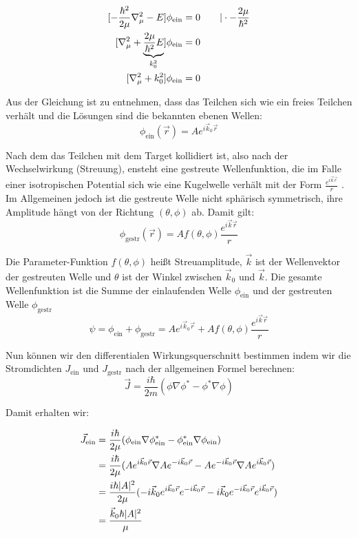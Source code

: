 \begin{align}
  \label{eq:7}
  [ -\frac{\hbar^2}{2\mu}\nabla_\mu^2 - E] \phi_{\text{ein}} &= 0 \qquad |\cdot -\frac{2\mu}{\hbar^2} \notag \\
  [ \nabla_\mu^2 +\underbrace{\frac{2\mu}{\hbar^2}  E}_{k_0^2} ] \phi_{\text{ein}} &= 0 \notag\\
  [ \nabla_\mu^2 +k_0^2 ] \phi_{\text{ein}} &= 0
\end{align}

Aus der Gleichung ist zu entnehmen, dass das Teilchen sich wie ein freies Teilchen verhält und die Lösungen sind die bekannten ebenen Wellen:
\begin{equation}
  \label{eq:8}
  \phi_{\text{ein}}(\vec r) = A e^{i\vec k_{0}\vec r}
\end{equation}

Nach dem das Teilchen mit dem Target kollidiert ist, also nach der Wechselwirkung (Streuung), ensteht eine gestreute Wellenfunktion, die im Falle einer isotropischen Potential sich wie eine Kugelwelle verhält mit der Form \(\frac{e^{i\vec k\vec r}}{r}\) . Im Allgemeinen jedoch ist die gestreute Welle nicht sphärisch symmetrisch, ihre Amplitude hängt von der Richtung \((\theta,\phi)\) ab. Damit gilt:
\begin{equation}
  \label{eq:9}
  \phi_{\text{gestr}}(\vec r) = A f(\theta,\phi)\frac{e^{i\vec k\vec r}}{r} 
\end{equation}

Die Parameter-Funktion \(f(\theta,\phi)\) heißt Streuamplitude, \(\vec k\) ist der Wellenvektor der gestreuten Welle und \(\theta\) ist der Winkel zwischen \(\vec k_0\) und \(\vec k\). Die gesamte Wellenfunktion ist die Summe der einlaufenden Welle \(\phi_{\text{ein}}\) und der gestreuten Welle \(\phi_{\text{gestr}}\)
\begin{equation}
  \label{eq:10}
   \psi = \phi_{\text{ein}}+ \phi_{\text{gestr}} = A e^{i\vec k_{0}\vec r} + A f(\theta,\phi)\frac{e^{i\vec k\vec r}}{r} 
\end{equation}

Nun können wir den differentialen Wirkungsquerschnitt bestimmen indem wir die Stromdichten \(J_{\text{ein}}\) und \(J_{\text{gestr}}\) nach der allgemeinen Formel berechnen:
\begin{equation}
  \label{eq:11}
  \vec J = \frac{i\hbar}{2m} (\phi \nabla \phi^* - \phi^*\nabla\phi)
\end{equation}

Damit erhalten wir:

\begin{align}
  \label{eq:12}
  \vec J_{\text{ein}} &= \frac{i\hbar}{2\mu} (\phi_{\text{ein}} \nabla \phi^*_{\text{ein}} - \phi^*_{\text{ein}}\nabla\phi_{\text{ein}})\notag\\
&= \frac{i\hbar}{2\mu} ( A e^{i\vec k_{0}\vec r} \nabla  A e^{-i\vec k_{0}\vec r} -  A e^{-i\vec k_{0}\vec r}\nabla A e^{i\vec k_{0}\vec r} )\notag\\
&= \frac{i\hbar|A|^2}{2\mu} (-i\vec k_{0} e^{i\vec k_{0}\vec r} e^{-i\vec k_{0}\vec r} -i\vec k_{0}  e^{-i\vec k_{0}\vec r} e^{i\vec k_{0}\vec r} )\notag\\
&= \frac{\vec k_{0}\hbar|A|^2}{\mu}
\end{align}

